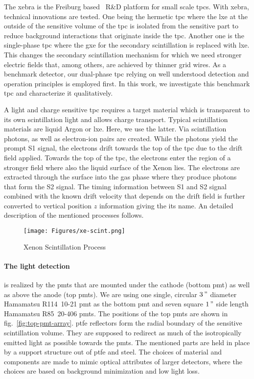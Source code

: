 The \gls{xebra} is the Freiburg based \darwin~R\&D platform for small scale \glspl{tpc}.
With \gls{xebra}, technical innovations are tested.
One being the hermetic \gls{tpc} where the \gls{lxe} at the outside of the sensitive volume of the \gls{tpc} is isolated from the sensitive part to reduce background interactions that originate inside the \gls{tpc}.
Another one is the single-phase \gls{tpc} where the \gls{gxe} for the secondary scintillation is replaced with \gls{lxe}.
This changes the secondary scintillation mechanism for which we need stronger electric fields that, among others, are achieved by thinner grid wires.
As a benchmark detector, our dual-phase \gls{tpc} relying on well understood detection and operation principles is employed first.
In this work, we investigate this benchmark \gls{tpc} and characterize it qualitatively.

A light and charge sensitive \gls{tpc} requires a target material which is transparent to its own scintillation light and allows charge transport.
Typical scintillation materials are liquid Argon or \gls{lxe}.
Here, we use the latter.
Via scintillation photons, as well as electron-ion pairs are created.
While the photons yield the prompt S1 signal, the electrons drift towards the top of the \gls{tpc} due to the drift field applied.
Towards the top of the \gls{tpc}, the electrons enter the region of a stronger field where also the liquid surface of the Xenon lies.
The electrons are extracted through the surface into the gas phase where they produce photons that form the S2 signal.
The timing information between S1 and S2 signal combined with the known drift velocity that depends on the drift field is further converted to vertical position $ z $ information giving the \emph{} its name.
An detailed description of the mentioned processes follows.

\begin{figure}
\centering
\texttt{[image: Figures/xe-scint.png]}  %
\caption[Xenon Scintillation Process]{
    Xenon Scintillation Process~\cite{ABism}
    }
\label{fig:xe-scint-process}
\end{figure}


\paragraph{The light detection} is realized by the \glspl{pmt} that are mounted under the cathode (bottom \gls{pmt}) as well as above the anode (top \glspl{pmt}).
We are using one single, circular $ 3\," $ diameter Hamamatsu R114~10-21 \gls{pmt} as the bottom \gls{pmt} and seven square $ 1\," $ side length Hamamatsu R85~20-406 \glspl{pmt}.
The positions of the top \glspl{pmt} are shown in fig.~\ref{fig:top-pmt-array}.
\gls{ptfe} reflectors form the radial boundary of the sensitive scintillation volume.
They are supposed to redirect as much of the isotropically emitted light as possible towards the \glspl{pmt}.
The mentioned parts are held in place by a support structure out of \gls{ptfe} and steel.
The choices of material and components are made to mimic optical attributes of larger detectors, where the choices are based on background minimization and low light loss.

